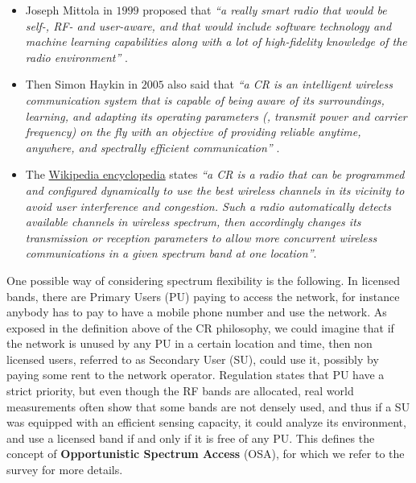 \begin{itemize}\tightlist
    \item
    Joseph Mittola in $1999$ proposed that
    \emph{``a really smart radio that would be self-, RF- and user-aware, and that would include software technology and machine learning capabilities along with a lot of high-fidelity knowledge of the radio environment''} \cite{Mitola99}.

    \item
    Then Simon Haykin in $2005$ also said that
    \emph{``a CR is an intelligent wireless communication system that is capable of being aware of its surroundings, learning, and adapting its operating parameters (\eg, transmit power and carrier frequency) on the fly with an objective of providing reliable anytime, anywhere, and spectrally efficient communication''} \cite{Haykin05}.

    \item
    The \href{https://en.wikipedia.org/wiki/Cognitive_radio}{Wikipedia encyclopedia} states
    \emph{``a CR is a radio that can be programmed and configured dynamically to use the best wireless channels in its vicinity to avoid user interference and congestion. Such a radio automatically detects available channels in wireless spectrum, then accordingly changes its transmission or reception parameters to allow more concurrent wireless communications in a given spectrum band at one location''}.
\end{itemize}


One possible way of considering spectrum flexibility is the following.
%
In licensed bands, there are Primary Users (PU) paying to access the network, for instance anybody has to pay to have a mobile phone number and use the network.
As exposed in the definition above of the CR philosophy, we could imagine that if the network is unused by any PU in a certain location and time, then non licensed users, referred to as Secondary User (SU), could use it, possibly by paying some rent to the network operator.
%
Regulation states that PU have a strict priority,
but even though the RF bands are allocated, real world measurements often show that some bands are not densely used, and thus if a SU was equipped with an efficient sensing capacity, it could analyze its environment, and use a licensed band if and only if it is free of any PU.
This defines the concept of \textbf{Opportunistic Spectrum Access} (OSA), for which we refer to the survey \cite{Zhao07} for more details.



